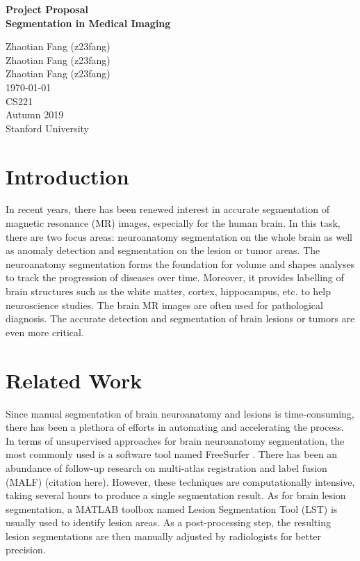 \documentclass[12pt]{article}
\begin{document}
    
\begin{titlepage}
    \centering
    \vspace*{2.5cm}
    
    \Huge
    \textbf{Project Proposal} \\
    
    \huge
    \textbf{Segmentation in Medical Imaging}
    
    \vfill
    
    \LARGE
    Zhaotian Fang (z23fang) \\
    Zhaotian Fang (z23fang) \\
    Zhaotian Fang (z23fang) \\
    \today \\
    CS221 \\
    Autumn 2019 \\
    Stanford University
\end{titlepage}

\section{Introduction}
In recent years, there has been renewed interest in accurate segmentation of magnetic resonance (MR) images, especially for the human brain. In this task, there are two focus areas: neuroanatomy segmentation on the whole brain as well as anomaly detection and segmentation on the lesion or tumor areas. The neuroanatomy segmentation forms the foundation for volume and shapes analyses to track the progression of diseases over time. Moreover, it provides labelling of brain structures such as the white matter, cortex, hippocampus, etc. to help neuroscience studies. The brain MR images are often used for pathological diagnosis. The accurate detection and segmentation of brain lesions or tumors are even more critical.

\section{Related Work}
Since manual segmentation of brain neuroanatomy and lesions is time-consuming, there has been a plethora of efforts in automating and accelerating the process. In terms of unsupervised approaches for brain neuroanatomy segmentation, the most commonly used is a software tool named FreeSurfer \cite{freesurfer}. There has been an abundance of follow-up research on multi-atlas registration and label fusion (MALF) (citation here). However, these techniques are computationally intensive, taking several hours to produce a single segmentation result. As for brain lesion segmentation, a MATLAB toolbox named Lesion Segmentation Tool (LST) is usually used to identify lesion areas. As a post-processing step, the resulting lesion segmentations are then manually adjusted by radiologists for better precision.
\end{document}

